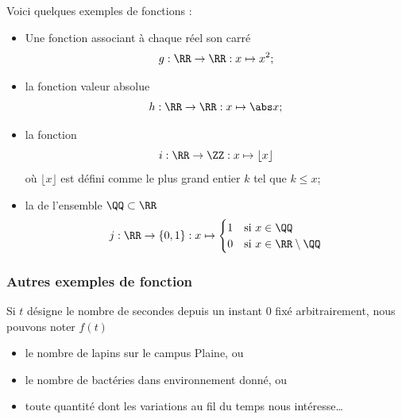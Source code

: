 \documentclass[french,xcolor=svgnames]{beamer}
\begin{document}
\begin{frame}
\begin{example}Voici quelques exemples de fonctions :\pause{}
  \begin{itemize}[<+->]
  \item Une fonction associant à chaque réel son carré
    \begin{equation*}
      g : \RR \to \RR : x \mapsto x^2 ;
    \end{equation*}
  \item la fonction valeur absolue
    \begin{equation*}
      h : \RR \to \RR : x \mapsto \abs x ;
    \end{equation*}
  \item la fonction 
    \begin{equation*}
      i : \RR \to \ZZ : x \mapsto \lfloor x \rfloor
    \end{equation*}
    où $\lfloor x \rfloor$ est défini comme le plus grand entier $k$ tel que $k \leqslant x$;
  \end{itemize}
\end{example}
\end{frame}

\begin{frame}
  \begin{example}
    \begin{itemize}[<+->]
    \item la  de l'ensemble \(\QQ \subset \RR\)
      \begin{equation*}
        j : \RR \to \{0,1\} : x \mapsto 
        \begin{cases}
          1 &\text{si } x \in \QQ\\
          0 &\text{si } x \in \RR \setminus \QQ
        \end{cases}
      \end{equation*}
    \end{itemize}
  \end{example}
\end{frame}
\begin{frame}
  \frametitle{Autres exemples de fonction}
  \begin{example}
    Si $t$ désigne le nombre de secondes depuis un instant $0$ fixé arbitrairement\pause{}, nous pouvons noter $f(t)$\pause{}
    \begin{itemize}[<+->]
    \item le nombre de lapins sur le campus Plaine, ou
    \item le nombre de bactéries dans environnement donné, ou
    \item toute quantité dont les variations au fil du temps nous intéresse\dots
    \end{itemize}
  \end{example}
\end{frame}
\end{document}
